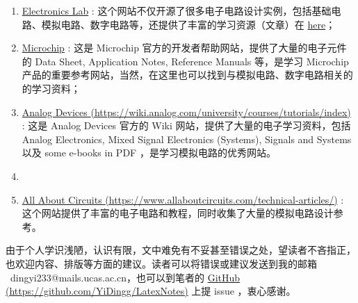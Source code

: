 \documentclass[UTF8]{report}
\begin{document}
\begin{cnabstract}
\begin{enumerate}
\item \href{https://www.electronics-lab.com}{Electronics Lab} : 这个网站不仅开源了很多电子电路设计实例，包括基础电路、模拟电路、数字电路等，还提供了丰富的学习资源（文章）在 \href{https://www.electronics-lab.com/articles/}{here}；

\item \href{https://developerhelp.microchip.com/}{Microchip} : 这是 Microchip 官方的开发者帮助网站，提供了大量的电子元件的 Data Sheet, Application Notes, Reference Manuals 等，是学习 Microchip 产品的重要参考网站，当然，在这里也可以找到与模拟电路、数字电路相关的的学习资料；

\item \href{https://wiki.analog.com/university/courses/tutorials/index}{Analog Devices {\color{black}(https://wiki.analog.com/university/courses/tutorials/index)}} : 这是 Analog Devices 官方的 Wiki 网站，提供了大量的电子学习资料，包括 Analog Electronics, Mixed Signal Electronics (Systems), Signals and Systems 以及 some e-books in PDF ，是学习模拟电路的优秀网站。

\item \item \href{https://www.allaboutcircuits.com/technical-articles/}{  All About Circuits  {\color{black} (https://www.allaboutcircuits.com/technical-articles/)}} : 这个网站提供了丰富的电子电路和教程，同时收集了大量的模拟电路设计参考。
\end{enumerate}

由于个人学识浅陋，认识有限，文中难免有不妥甚至错误之处，望读者不吝指正，也欢迎内容、排版等方面的建议。读者可以将错误或建议发送到我的邮箱 {\color{blue}\ dingyi233@mails.ucas.ac.cn}，也可以到笔者的 \href{https://github.com/YiDingg/LatexNotes}{GitHub (https://github.com/YiDingg/LatexNotes)} 上提 issue ，衷心感谢。

\end{cnabstract}
\end{document}

